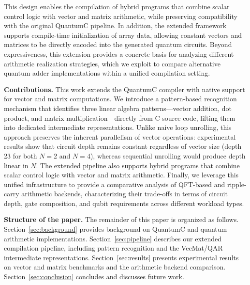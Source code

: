 This design enables the compilation of hybrid programs that combine scalar control logic with vector and matrix arithmetic, while preserving compatibility with the original QuantumC pipeline. In addition, the extended framework supports compile-time initialization of array data, allowing constant vectors and matrices to be directly encoded into the generated quantum circuits. Beyond expressiveness, this extension provides a concrete basis for analyzing different arithmetic realization strategies, which we exploit to compare alternative quantum adder implementations within a unified compilation setting.

\textbf{Contributions.} This work extends the QuantumC compiler with native support for vector and matrix computations. We introduce a pattern-based recognition mechanism that identifies three linear algebra patterns---vector addition, dot product, and matrix multiplication---directly from C source code, lifting them into dedicated intermediate representations. Unlike naive loop unrolling, this approach preserves the inherent parallelism of vector operations: experimental results show that circuit depth remains constant regardless of vector size (depth 23 for both $N=2$ and $N=4$), whereas sequential unrolling would produce depth linear in $N$. The extended pipeline also supports hybrid programs that combine scalar control logic with vector and matrix arithmetic. Finally, we leverage this unified infrastructure to provide a comparative analysis of QFT-based and ripple-carry arithmetic backends, characterizing their trade-offs in terms of circuit depth, gate composition, and qubit requirements across different workload types.

\textbf{Structure of the paper.} The remainder of this paper is organized as follows. Section~\ref{sec:background} provides background on QuantumC and quantum arithmetic implementations. Section~\ref{sec:pipeline} describes our extended compilation pipeline, including pattern recognition and the VecMat/QAR intermediate representations. Section~\ref{sec:results} presents experimental results on vector and matrix benchmarks and the arithmetic backend comparison. Section~\ref{sec:conclusion} concludes and discusses future work.
